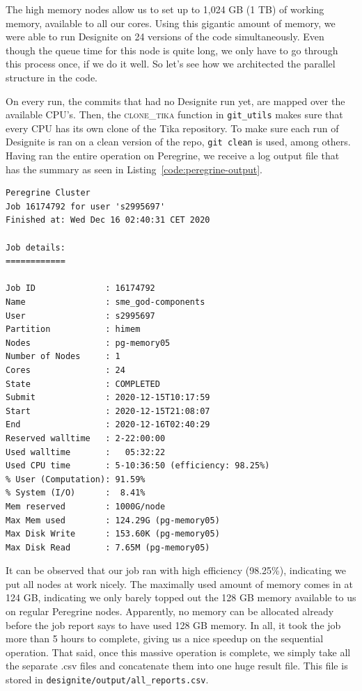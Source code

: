 \documentclass{article}
\begin{document}
The high memory nodes allow us to set up to 1,024 GB (1 TB) of working memory, available to all our cores. Using this gigantic amount of memory, we were able to run Designite on 24 versions of the code simultaneously. Even though the queue time for this node is quite long, we only have to go through this process once, if we do it well. So let's see how we architected the parallel structure in the code.

On every run, the commits that had no Designite run yet, are mapped over the available CPU's. Then, the \textsc{clone\_tika} function in \texttt{git\_utils} makes sure that every CPU has its own clone of the Tika repository. To make sure each run of Designite is ran on a clean version of the repo, \texttt{git clean} is used, among others. Having ran the entire operation on Peregrine, we receive a log output file that has the summary as seen in Listing~\ref{code:peregrine-output}.

\begin{lstlisting}[caption={Peregrine job output.}, label={code:peregrine-output}]
Peregrine Cluster
Job 16174792 for user 's2995697'
Finished at: Wed Dec 16 02:40:31 CET 2020

Job details:
============

Job ID              : 16174792
Name                : sme_god-components
User                : s2995697
Partition           : himem
Nodes               : pg-memory05
Number of Nodes     : 1
Cores               : 24
State               : COMPLETED
Submit              : 2020-12-15T10:17:59
Start               : 2020-12-15T21:08:07
End                 : 2020-12-16T02:40:29
Reserved walltime   : 2-22:00:00
Used walltime       :   05:32:22
Used CPU time       : 5-10:36:50 (efficiency: 98.25%)
% User (Computation): 91.59%
% System (I/O)      :  8.41%
Mem reserved        : 1000G/node
Max Mem used        : 124.29G (pg-memory05)
Max Disk Write      : 153.60K (pg-memory05)
Max Disk Read       : 7.65M (pg-memory05)
\end{lstlisting}

It can be observed that our job ran with high efficiency (98.25\%), indicating we put all nodes at work nicely. The maximally used amount of memory comes in at 124 GB, indicating we only barely topped out the 128 GB memory available to us on regular Peregrine nodes. Apparently, no memory can be allocated already before the job report says to have used 128 GB memory. In all, it took the job more than 5 hours to complete, giving us a nice speedup on the sequential operation. That said, once this massive operation is complete, we simply take all the separate .csv files and concatenate them into one huge result file. This file is stored in \texttt{designite/output/all\_reports.csv}.
\end{document}
